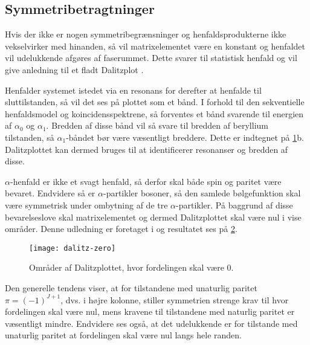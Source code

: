 \begin{figure}[h]
  \centering
  \hfill
  \caption{}
  \label{fig:dalitz-triangle}
\end{figure}

\subsection{Symmetribetragtninger}
\label{sec:symbetragt}

Hvis der ikke er nogen symmetribegrænsninger og henfaldsprodukterne ikke vekselvirker med hinanden,
så vil matrixelementet være en konstant og henfaldet vil udelukkende afgøres af faserummet. Dette
svarer til statistisk henfald og vil give anledning til et fladt Dalitzplot \cite{Fedorov}.

Henfalder systemet istedet via en resonans for derefter at henfalde til sluttilstanden, så vil det
ses på plottet som et bånd. I forhold til den sekventielle henfaldsmodel og koincidensspektrene, så
forventes et bånd svarende til energien af $\alpha_{0}$ og $\alpha_{1}$. Bredden af disse bånd vil så svare
til bredden af beryllium tilstanden, så $\alpha_{1}$-båndet bør være væsentligt breddere. Dette er
indtegnet på \cref{fig:dalitz-triangle}b. Dalitzplottet kan dermed bruges til at identificerer
 resonanser og bredden af disse.

$\alpha$-henfald er ikke et svagt henfald, så derfor skal både spin og paritet være bevaret. Endvidere så
er $\alpha$-partikler bosoner, så den samlede bølgefunktion skal være symmetrisk under ombytning af de
tre $\alpha$-partikler. På baggrund af disse
bevarelseslove skal matrixelementet og dermed Dalitzplottet skal være nul i vise områder. Denne
udledning er foretaget i\cite{Fedorov} og resultatet ses på \cref{fig:dalitz-0}.
\begin{figure}[h]
  \centering
  \texttt{[image: dalitz-zero]}
  \caption{Områder af Dalitzplottet, hvor fordelingen skal være 0. }
  \label{fig:dalitz-0}
\end{figure}

Den generelle tendens viser, at for tilstandene med unaturlig paritet $\pi = (-1)^{J+1}$, dvs. i højre
kolonne, stiller symmetrien strenge krav til hvor fordelingen skal være nul, mens kravene til
tilstandene med naturlig paritet er væsentligt mindre. Endvidere ses også, at det udelukkende er for
tilstande med unaturlig paritet at fordelingen skal være nul langs hele randen. 

